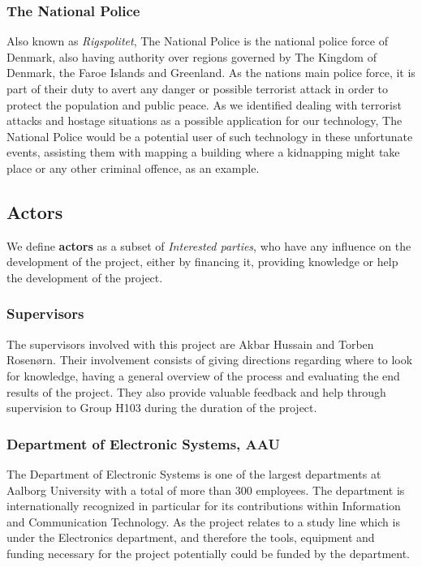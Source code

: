 \subsubsection{The National Police}
Also known as \textit{Rigspolitet}\cite{Police}, The National Police is the national police force of Denmark, also having authority over regions governed by The Kingdom of Denmark, the Faroe Islands and Greenland. As the nations main police force, it is part of their duty to avert any danger or possible terrorist attack in order to protect the population and public peace. As we identified dealing with terrorist attacks and hostage situations as a possible application for our technology, The National Police would be a potential user of such technology in these unfortunate events, assisting them with mapping a building where a kidnapping might take place or any other criminal offence, as an example.

\subsection{Actors}
We define \textbf{actors} as a subset of \textit{Interested parties}, who have any influence on the development of the project, either by financing it, providing knowledge or help the development of the project.

\subsubsection{Supervisors} 
The supervisors involved with this project are Akbar Hussain and Torben Rosenørn. Their involvement consists of giving directions regarding where to look for knowledge, having a general overview of the process and evaluating the end results of the project. They also provide valuable feedback and help through supervision to Group H103 during the duration of the project.

\subsubsection{Department of Electronic Systems, AAU} 
The Department of Electronic Systems is one of the largest departments at Aalborg University with a total of more than 300 employees. The department is internationally recognized in particular for its contributions within Information and Communication Technology\cite{aaues}. As the project relates to a study line which is under the Electronics department, and therefore the tools, equipment and funding necessary for the project potentially could be funded by the department.
	
